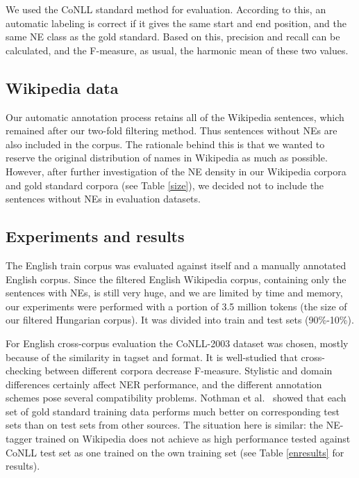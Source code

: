 \documentclass[11pt]{article}
\begin{document}
We used the CoNLL standard method for evaluation. According to this, an automatic labeling is correct if it gives the same start and end position, and the same NE class as the gold standard. Based on this, precision and recall can be calculated, and the F-measure, as usual, the harmonic mean of these two values.  

\subsection{Wikipedia data}

Our automatic annotation process retains all of the Wikipedia sentences, which remained after our two-fold filtering method. Thus sentences without NEs are also included in the corpus. The rationale behind this is that we wanted to reserve the original distribution of names in Wikipedia as much as possible. However, after further investigation of the NE density in our Wikipedia corpora and gold standard corpora (see Table \ref{size}), we decided not to include the sentences without NEs in evaluation datasets. 

\subsection{Experiments and results}

The English train corpus was evaluated against itself and a manually annotated English corpus. Since the filtered English Wikipedia corpus, containing only the sentences with NEs, is still very huge, and we are limited by time and memory, our experiments were performed with a portion of 3.5 million tokens (the size of our filtered Hungarian corpus). It was divided into train and test sets (90\%-10\%). 

For English cross-corpus evaluation the CoNLL-2003 dataset was chosen, mostly because of the similarity in tagset and format. It is well-studied that cross-checking between different corpora decrease F-measure. Stylistic and domain differences certainly affect NER performance, and the different annotation schemes pose several compatibility problems. Nothman et al.~ showed that each set of gold standard training data performs much better on corresponding test sets than on test sets from other sources. The situation here is similar: the NE-tagger trained on Wikipedia does not achieve as high performance tested against CoNLL test set as one trained on the own training set (see Table \ref{enresults} for results). 
\end{document}
